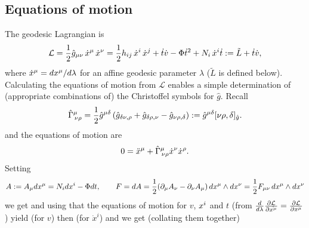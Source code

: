 \documentclass{article}
\begin{document}
\subsection{Equations of motion}
The geodesic Lagrangian is
$$\mathcal{ L}=\frac12 \hat  g_{\mu\nu}\,\dot x\sp{\mu}\,\dot x\sp{\nu}=
\frac12 h_{ij}\, \dot x\sp{i}\, \dot x\sp{j}+\dot t \dot v-\Phi {\dot t}^2+N_i \,\dot x\sp{i}\dot t
:= \tilde{L}+\dot t \dot v  ,
$$
where $\dot x\sp{\mu}=dx\sp{\mu}/d\lambda$ for an affine geodesic parameter $\lambda$ ($\tilde{L}$ is defined below).
Calculating the equations of motion from $\mathcal{L}$ enables a simple determination of (appropriate
combinations of) the  Christoffel symbols for $\hat g$. Recall
$$\hat \Gamma\sp{\mu}_{\, \nu \rho}=\frac12 \hat g\sp{\mu \delta}\left(
\hat g_{\delta \nu, \rho} + \hat g_{\delta \rho, \nu} - \hat g_{ \nu \rho,\delta}\right)
:=  \hat g\sp{\mu \delta}[ \nu \rho,\delta]_{\hat g}.
$$
and the equations of motion are
$$ 0=\ddot x\sp{\mu}+ \hat \Gamma\sp{\mu}_{\, \nu \rho} \dot x\sp{\nu}\dot x\sp{\rho}.
$$
Setting
$$A:=A_\mu dx\sp{\mu}=N_i dx\sp{i}-\Phi dt,\qquad
F=dA=\frac12 (\partial_\mu A_\nu- \partial_\nu A_\mu)\, dx\sp\mu \wedge dx\sp\nu =\frac12 F_{\mu\nu}
\, dx\sp\mu \wedge dx\sp\nu
$$
we get 
and using that the equations of motion for $v$, $x\sp{i}$ and $t$ (from $\frac{d}{d\lambda}\pd[\mc{L}]{\dot{x^\mu}} = \pd[\mc{L}]{x^\mu}$) yield
(for $v$) then 
(for $\dot{x}^i$) and 
we get (collating them together)
\end{document}
